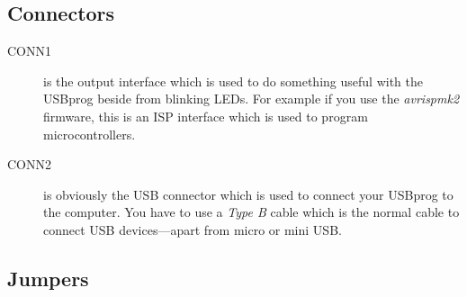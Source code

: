 \documentclass[bibtotoc,UKenglish,halfparskip,oneside,DIV12]{scrreprt}
\begin{document}
\subsection{Connectors}
\label{sec:connectors}

\begin{description}
  \item[CONN1] is the output interface which is used to do something useful with the USBprog beside
    from blinking LEDs. For example if you use the \emph{avrispmk2} firmware, this is an ISP
    interface which is used to program microcontrollers.

  \item[CONN2] is obviously the USB connector which is used to connect your USBprog to the computer.
    You have to use a \emph{Type B} cable which is the normal cable to connect USB devices---apart
    from micro or mini USB.
\end{description}


\subsection{Jumpers}
\label{sec:jumpers}
\end{document}
